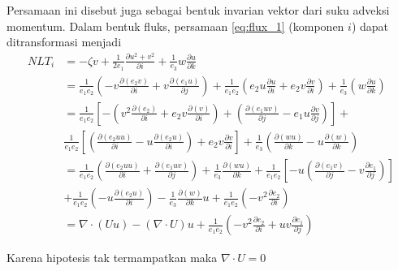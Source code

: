 \begin{spacing}{1.5}
	Persamaan ini disebut juga sebagai bentuk invarian vektor dari suku adveksi momentum. Dalam bentuk fluks, persamaan \ref{eq:flux_1} (komponen $i$) dapat ditransformasi menjadi
	\begin{equation*}
		\begin{aligned}
			NLT_i &= -\zeta v + \frac{1}{2e_1} \frac{\partial u^2+v^2}{\partial i} + \frac{1}{e_3}w\frac{\partial u}{\partial k} \\
			&= \frac{1}{e_1 e_2}\left(-v\frac{\partial (e_2 v)}{\partial i} + v\frac{\partial (e_1 u)}{\partial j}\right) + \frac{1}{e_1 e_2}\left(e_2 u\frac{\partial u}{\partial i} + e_2 v\frac{\partial v}{\partial i}\right) + \frac{1}{e_3}\left( w\frac{\partial u}{\partial k}\right)  
			\\
			&= \frac{1}{e_1 e_2} \left[-\left(v^2\frac{\partial (e_2)}{\partial i} + e_2v\frac{\partial (v)}{\partial i}\right) + \left(\frac{\partial (e_1uv)}{\partial j} - e_1u\frac{\partial v}{\partial j}\right)\right] +  
			\\
			& \frac{1}{e_1 e_2} \left[\left(\frac{\partial (e_2uu)}{\partial i} - u\frac{\partial (e_2u)}{\partial i}\right) + e_2v\frac{\partial v}{\partial i} \right] + \frac{1}{e_3}\left(\frac{\partial (wu)}{\partial k} - u\frac{\partial (w)}{\partial k}\right) 
			\\
			&= \frac{1}{e_1e_2}\left(\frac{\partial (e_2uu)}{\partial i} + \frac{\partial (e_1uv)}{\partial j}\right)+
			\frac{1}{e_3}\frac{\partial (wu)}{\partial k}+\frac{1}{e_1e_2}\left[-u\left(\frac{\partial (e_1v)}{\partial j}-v\frac{\partial e_1}{\partial j}\right)\right] 
			\\ 
			& + \frac{1}{e_1e_2}\left(-u\frac{\partial (e_2u)}{\partial i}\right) - \frac{1}{e_3}\frac{\partial (w)}{\partial k}u + \frac{1}{e_1e_2}\left(-v^2\frac{\partial e_2}{\partial i}\right)  	
			\\
			&= \nabla \cdot (Uu)-(\nabla \cdot U)u + \frac{1}{e_1e_2}\left(-v^2\frac{\partial e_2}{\partial i}+uv\frac{\partial e_1}{\partial j}\right)  
		\end{aligned}
	\end{equation*}
	
	Karena hipotesis tak termampatkan maka $\nabla \cdot U = 0$
\end{spacing}
\vspace{-0.1pc}

